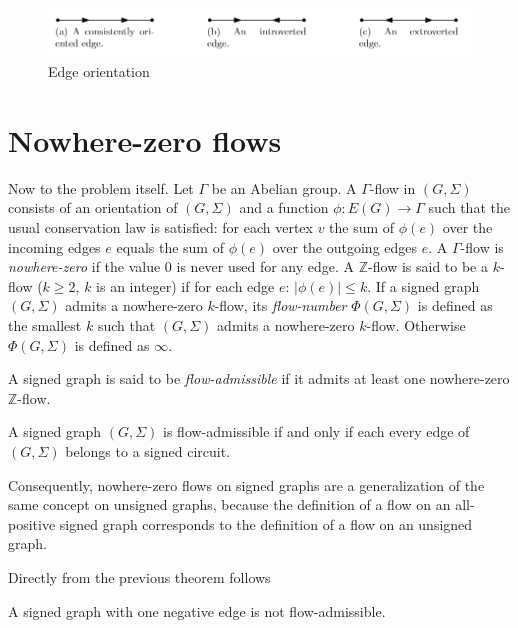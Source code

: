 \begin{figure}[ht]\label{fig:edge-orientation}
    \centering
    \includegraphics[scale=0.65]{images/oriented-edges.png}
    \caption{Edge orientation}
\end{figure}

\section{Nowhere-zero flows}

Now to the problem itself. Let $\Gamma$ be an Abelian group. A $\Gamma$-flow in $(G, \Sigma)$ consists of an orientation of $(G, \Sigma)$ and 
a function $\phi : E(G) \rightarrow \Gamma$ such that the usual conservation law is satisfied: 
for each vertex $v$ the sum of $\phi (e)$ over the incoming edges $e$ equals the sum of $\phi (e)$ over the outgoing edges $e$\cite{nowhere-zero-flows-survey}.
A $\Gamma$-flow is \textit{nowhere-zero} if the value $0$ is never used for any edge.
A $\mathbb{Z}$-flow is said to be a $k$-flow ($k \geq 2$, $k$ is an integer) if for each edge $e$: $|\phi (e)| \leq k$.
If a signed graph $(G, \Sigma)$ admits a nowhere-zero $k$-flow, its \textit{flow-number} $\Phi (G, \Sigma)$ is defined as the smallest $k$ such that $(G, \Sigma)$ admits a nowhere-zero $k$-flow.
Otherwise $\Phi (G, \Sigma)$ is defined as $\infty$.

A signed graph is said to be \textit{flow-admissible} if it admits at least one nowhere-zero $\mathbb{Z}$-flow.

\begin{theorem}
    A signed graph $(G, \Sigma)$ is flow-admissible if and only if each every edge of $(G, \Sigma)$ belongs to a signed circuit.
\end{theorem}

Consequently, nowhere-zero flows on signed graphs are a generalization of the same concept on unsigned graphs, 
because the definition of a flow on an all-positive signed graph corresponds to the definition of a flow on an unsigned graph.

Directly from the previous theorem follows 

\begin{corollary}\label{one-negative-edge-flow}
    A signed graph with one negative edge is not flow-admissible.
\end{corollary}

